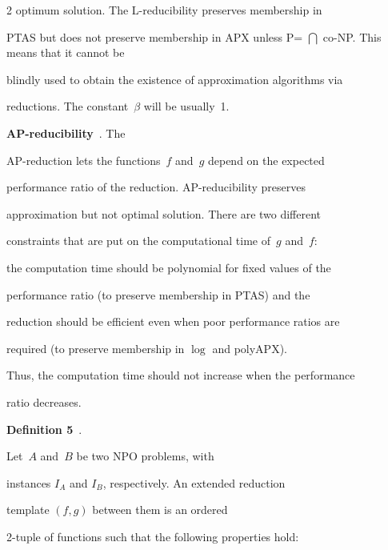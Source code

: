 \begin{multicols}{2}
optimum solution. The L-reducibility preserves membership in


PTAS but does not preserve membership in {APX} unless {P}\;= $\bigcap$ co-{NP}. This means that it cannot be


blindly used to obtain the existence of approximation algorithms via


reductions. The constant~$\beta$ will be usually~1.





\smallskip





\noindent


\textbf{AP-reducibility}~\cite{TrevisanLuca}. The


AP-reduction lets the functions~$f$ and~$g$ depend on the expected


performance ratio of the reduction. AP-reducibility preserves


approximation but not optimal solution. There are two different


constraints that are put on the computational time of~$g$ and~$f$:


the computation time should be polynomial for fixed values of the


performance ratio (to preserve membership in PTAS) and the


reduction should be efficient even when poor performance ratios are


required (to preserve membership in $\log$ and poly{APX}).


Thus, the computation time should not increase when the performance


ratio decreases.





\smallskip





\noindent


\textbf{Definition 5}~\cite{TrevisanLuca}.


Let~$A$ and~$B$ be two {NPO} problems, with


instances $I_{A}$ and $I_{B}$, respectively. An extended reduction


template $(f,g)$ between them is an ordered


2-tuple of functions such that the following properties hold:


\begin{itemize}



\end{itemize}
\end{multicols}
